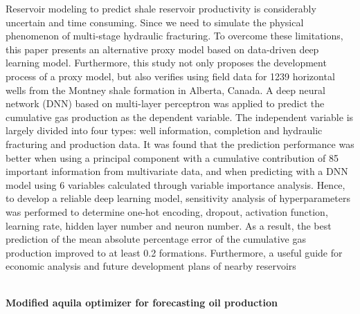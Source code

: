 Reservoir modeling to predict shale reservoir productivity is considerably uncertain and
time consuming. Since we need to simulate the physical phenomenon of multi-stage hydraulic
fracturing. To overcome these limitations, this paper presents an alternative proxy model based
on data-driven deep learning model. Furthermore, this study not only proposes the development
process of a proxy model, but also verifies using field data for 1239 horizontal wells from the Montney
shale formation in Alberta, Canada. A deep neural network (DNN) based on multi-layer perceptron
was applied to predict the cumulative gas production as the dependent variable. The independent
variable is largely divided into four types: well information, completion and hydraulic fracturing
and production data. It was found that the prediction performance was better when using a principal
component with a cumulative contribution of 85%
important information from multivariate data, and when predicting with a DNN model using 6
variables calculated through variable importance analysis. Hence, to develop a reliable deep learning
model, sensitivity analysis of hyperparameters was performed to determine one-hot encoding,
dropout, activation function, learning rate, hidden layer number and neuron number. As a result, the
best prediction of the mean absolute percentage error of the cumulative gas production improved
to at least 0.2%
formations. Furthermore, a useful guide for economic analysis and future development plans of
nearby reservoirs

\\

\textbf{Modified aquila optimizer for forecasting oil production}


